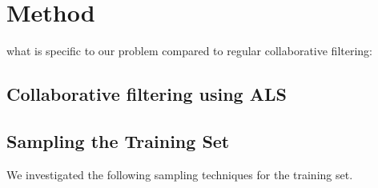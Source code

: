 \documentclass[10pt, conference, compsocconf]{IEEEtran}
\begin{document}





\section{Method}

what is specific to our problem compared to regular collaborative filtering:

\subsection{Collaborative filtering using ALS}




\subsection{Sampling the Training Set}

We investigated the following sampling techniques for the training set. 

\end{document}
